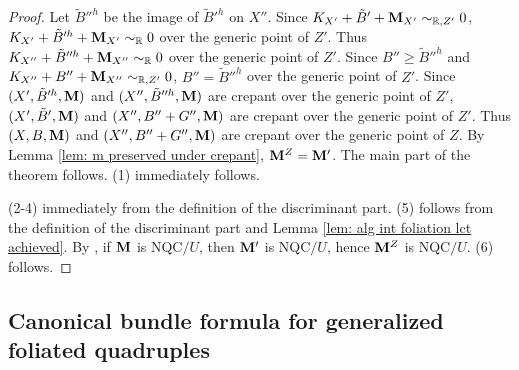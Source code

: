 \documentclass[11pt]{amsart}
\numberwithin{equation}{section}
\newcommand{\Mm}{{\bf{M}}}
\theoremstyle{definition}
\theoremstyle{definition}
\theoremstyle{definition}
\begin{document}
\begin{proof}
Let $\tilde B''^h$ be the image of $\tilde B'^h$ on $X''$. Since $K_{X'}+\tilde B'+\Mm_{X'}\sim_{\mathbb R,Z'}0$,  $K_{X'}+\tilde B'^h+\Mm_{X'}\sim_{\mathbb R}0$ over the generic point of $Z'$. Thus $K_{X''}+\tilde B''^h+\Mm_{X''}\sim_{\mathbb R}0$ over the generic point of $Z'$. Since $B''\geq\tilde B''^h$ and $K_{X''}+B''+\Mm_{X''}\sim_{\mathbb R,Z'}0$, $B''=\tilde B''^h$ over the generic point of $Z'$. Since $(X',\tilde B'^h,\Mm)$ and $(X'',\tilde B''^h,\Mm)$ are crepant over the generic point of $Z'$, $(X',\tilde B',\Mm)$ and $(X'',B''+G'',\Mm)$ are crepant over the generic point of $Z'$. Thus $(X,B,\Mm)$ and $(X'',B''+G'',\Mm)$ are crepant over the generic point of $Z$. By Lemma \ref{lem: m preserved under crepant}, $\Mm^Z=\Mm'$. The main part of the theorem follows. (1) immediately follows.

(2-4) immediately from the definition of the discriminant part. (5) follows from the definition of the discriminant part and Lemma \ref{lem: alg int foliation lct achieved}. By \cite[Theorem 2.23]{JLX22}, if $\Mm$ is NQC$/U$, then $\Mm'$ is NQC$/U$, hence $\Mm^Z$ is NQC$/U$. (6) follows.
\end{proof}

\subsection{Canonical bundle formula for generalized foliated quadruples}\label{subsec: cbf gfq}
\end{document}
